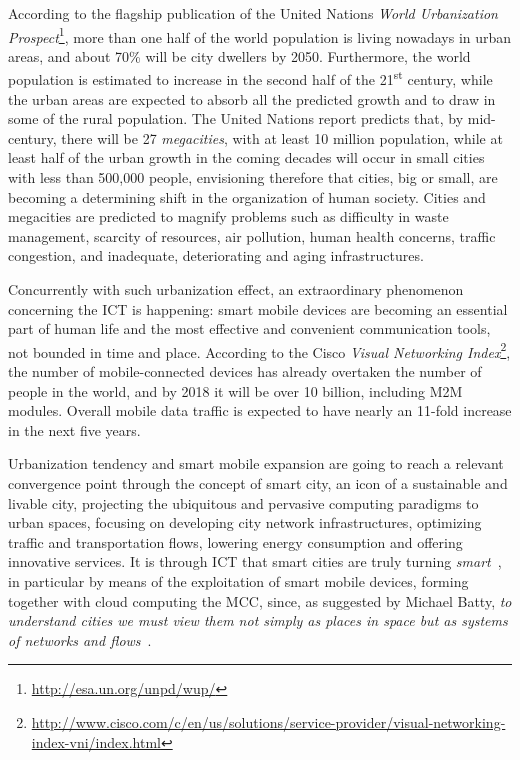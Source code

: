 \documentclass[twoside,openright]{report}
\begin{document}
According to the flagship publication of the United Nations \emph{World Urbanization Prospect}\footnote{\url{http://esa.un.org/unpd/wup/}}, more than one half of the world population is living nowadays in urban areas, and about 70\% will be city dwellers by 2050. 
Furthermore, the world population is estimated to increase in the second half of the 21\textsuperscript{st} century, while the urban areas are expected to absorb all the predicted growth and to draw in some of the rural population. 
The United Nations report predicts that,  by mid-century, there will be 27 \emph{megacities}, with at least 10 million population, while at least half of the urban growth in the coming decades will occur in small cities with less than 500,000 people, envisioning therefore that cities, big or small, are becoming a determining shift in the organization of human society. 
Cities and megacities are predicted to magnify problems such as difficulty in waste management, scarcity of resources, air pollution, human health concerns, traffic congestion, and inadequate, deteriorating and aging infrastructures.

Concurrently with such urbanization effect, an extraordinary phenomenon concerning the \gls{ICT} is happening: smart mobile devices are becoming an essential part of human life and the most effective and convenient communication tools, not bounded in time and place.
According to the Cisco \emph{Visual Networking Index}\footnote{\url{http://www.cisco.com/c/en/us/solutions/service-provider/visual-networking-index-vni/index.html}}, the number of mobile-connected devices has already overtaken the number of people in the world, and by 2018 it will be over 10 billion, including \gls{M2M} modules. 
Overall mobile data traffic is expected to have nearly an 11-fold increase in the next five years. 

Urbanization tendency and smart mobile expansion are going to reach a relevant convergence point through the concept of smart city, an icon of a sustainable and livable city, projecting the ubiquitous and pervasive computing paradigms to urban spaces, focusing on developing city network infrastructures, optimizing traffic and transportation flows, lowering energy consumption and offering innovative services. 
It is through \gls{ICT} that smart cities are truly turning \emph{smart}~\cite{Ratti}, in particular by means of the exploitation of smart mobile devices, forming together with cloud computing the \gls{MCC}, since, as suggested by Michael Batty, \textit{to understand cities we must view them not simply as places in space but as systems of networks and flows}~\cite{Batty}. 
\end{document}
